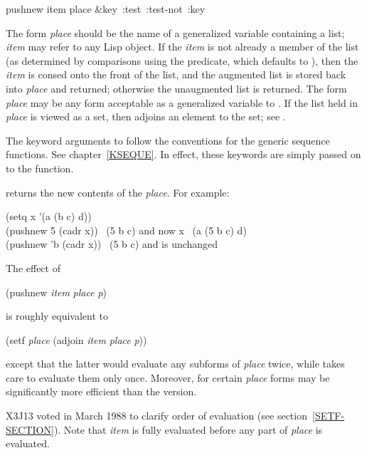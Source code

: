 \begin{defmac}
pushnew item place \hbox\bgroup\cf &key :test :test-not :key\egroup

The form {\it place} should be the name of a generalized variable
containing a list; {\it item} may refer to any Lisp object.  If the
{\it item} is not already a member of the list (as determined by
comparisons using the  predicate, which defaults to ),
then the {\it item} is consed onto the front of the list, and
the augmented list is stored back into {\it place} and returned; otherwise
the unaugmented list is returned.  The form {\it place} may be
any form acceptable as a generalized variable to .  If the
list held in {\it place} is viewed as a set, then  adjoins an
element to the set; see .

The keyword arguments to 
follow the conventions for the generic sequence
functions.  See chapter~\ref{KSEQUE}.
In effect, these keywords are simply passed on to the  function.

 returns the new contents of the {\it place}.
For example:
\begin{lisp}
(setq x '(a (b c) d)) \\
(pushnew 5 (cadr x)) \EV\ (5 b c)   {\rm and now} x \EV\ (a (5 b c) d) \\
(pushnew 'b (cadr x)) \EV\ (5 b c)  {\rm and  is unchanged}
\end{lisp}
The effect of
\begin{lisp}
(pushnew {\it item} {\it place}  {\it p})
\end{lisp}
is roughly equivalent to
\begin{lisp}
(setf {\it place} (adjoin {\it item} {\it place}  {\it p}))
\end{lisp}
except that the latter would evaluate any subforms of
{\it place} twice, while  takes care to evaluate them only once.
Moreover, for certain {\it place} forms  may be
significantly more efficient than the  version.
\begin{newer}
X3J13 voted in March 1988 
to clarify order of evaluation (see section~\ref{SETF-SECTION}).
Note that {\it item} is fully evaluated before any part of {\it place}
is evaluated.
\end{newer}
\end{defmac}

